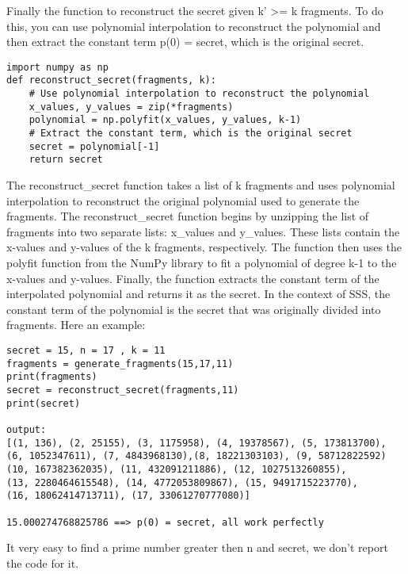 \documentclass{article}
\begin{document}
Finally the function to reconstruct the secret given k' >= k fragments. To do this, you can use polynomial interpolation to reconstruct the polynomial and then extract the constant term p(0) = secret, which is the original secret.
\begin{lstlisting}
import numpy as np
def reconstruct_secret(fragments, k):
    # Use polynomial interpolation to reconstruct the polynomial
    x_values, y_values = zip(*fragments)
    polynomial = np.polyfit(x_values, y_values, k-1)
    # Extract the constant term, which is the original secret
    secret = polynomial[-1]
    return secret
\end{lstlisting}
The reconstruct\_secret function takes a list of k fragments and uses polynomial interpolation to reconstruct the original polynomial used to generate the fragments. The reconstruct\_secret function begins by unzipping the list of fragments into two separate lists: x\_values and y\_values. These lists contain the x-values and y-values of the k fragments, respectively. The function then uses the polyfit function from the NumPy library to fit a polynomial of degree k-1 to the x-values and y-values. Finally, the function extracts the constant term of the interpolated polynomial and returns it as the secret. In the context of SSS, the constant term of the polynomial is the secret that was originally divided into fragments. Here an example:
\begin{lstlisting}
secret = 15, n = 17 , k = 11
fragments = generate_fragments(15,17,11)
print(fragments)
secret = reconstruct_secret(fragments,11)
print(secret)

output:
[(1, 136), (2, 25155), (3, 1175958), (4, 19378567), (5, 173813700), 
(6, 1052347611), (7, 4843968130),(8, 18221303103), (9, 58712822592)
(10, 167382362035), (11, 432091211886), (12, 1027513260855),
(13, 2280464615548), (14, 4772053809867), (15, 9491715223770),
(16, 18062414713711), (17, 33061270777080)]

15.000274768825786 ==> p(0) = secret, all work perfectly
\end{lstlisting}
It very easy to find a prime number greater then n and secret, we don't report the code for it.
\end{document}
